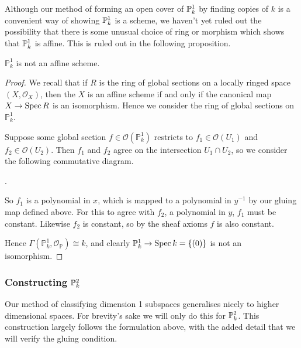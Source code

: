 Although our method of forming an open cover of $\P_k^1$ by finding copies of $k$ is a convenient way of showing $\P_k^1$ is a scheme, we haven't yet ruled out the possibility that there is some unusual choice of ring or morphism which shows that $\P_k^1$ is affine. This is ruled out in the following proposition.

\begin{proposition}
$\mathbb{P}_k^1$ is not an affine scheme.
\end{proposition}

\begin{proof}
We recall that if $R$ is the ring of global sections on a locally ringed space $(X, \mathcal{O}_X)$, then the $X$ is an affine scheme if and only if the canonical map $X \to \Spec R$ is an isomorphism. Hence we consider the ring of global sections on $\mathbb{P}_k^1$.

Suppose some global section $f \in \mathcal{O}(\mathbb{P}_k^1)$ restricts to $f_1 \in \mathcal{O}(U_1)$ and $f_2 \in \mathcal{O}(U_2)$. Then $f_1$ and $f_2$ agree on the intersection $U_1 \cap U_2$, so we consider the following commutative diagram.
\begin{center}
.
\end{center}
So $f_1$ is a polynomial in $x$, which is mapped to a polynomial in $y^{-1}$ by our gluing map defined above. For this to agree with $f_2$, a polynomial in $y$, $f_1$ must be constant. Likewise $f_2$ is constant, so by the sheaf axioms $f$ is also constant.

Hence $\Gamma(\mathbb{P}_k^1, \mathcal{O}_\mathbb{P}) \cong k$, and clearly $\mathbb{P}_k^1 \to \Spec k = \{(0)\}$ is not an isomorphism.
\end{proof}

\subsubsection{Constructing $\P_k^2$}

Our method of classifying dimension 1 subspaces generalises nicely to higher dimensional spaces. For brevity's sake we will only do this for $\P_k^2$. This construction largely follows the formulation above, with the added detail that we will verify the gluing condition.

